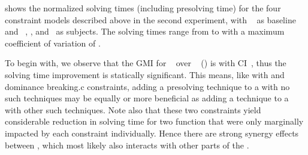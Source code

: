  shows the normalized solving
times (including \gls{presolving} time) for the four \glspl{constraint model}
described above in the second experiment, with ~\modelC{} as \gls{baseline} and ~\modelD,
\modelE, and~\modelF{} as \glspl{subject}.
%
The solving times range from
\printMinSolvingTime{
  \SolvTechEnableOnlyGoodPresolvingPrePlusSolvingTimeSpeedupNonePrePlusSolvingTimeAvgMin,
  \SolvTechEnableOnlyGoodPresolvingPrePlusSolvingTimeSpeedupPrePlusSolvingTimeAvgMin,
  \SolvTechDisableBadPresolvingPrePlusSolvingTimeSpeedupPrePlusSolvingTimeAvgMin,
  \SolvTechDisableAllPresolvingPrePlusSolvingTimeSpeedupPrePlusSolvingTimeAvgMin
} to
\printMaxSolvingTime{
  \SolvTechEnableOnlyGoodPresolvingPrePlusSolvingTimeSpeedupNonePrePlusSolvingTimeAvgMax,
  \SolvTechEnableOnlyGoodPresolvingPrePlusSolvingTimeSpeedupPrePlusSolvingTimeAvgMax,
  \SolvTechDisableBadPresolvingPrePlusSolvingTimeSpeedupPrePlusSolvingTimeAvgMax,
  \SolvTechDisableAllPresolvingPrePlusSolvingTimeSpeedupPrePlusSolvingTimeAvgMax
} with a maximum coefficient of variation of
\numMaxOf{
  \SolvTechEnableOnlyGoodPresolvingPrePlusSolvingTimeSpeedupNonePrePlusSolvingTimeCvMax,
  \SolvTechEnableOnlyGoodPresolvingPrePlusSolvingTimeSpeedupPrePlusSolvingTimeCvMax,
  \SolvTechDisableBadPresolvingPrePlusSolvingTimeSpeedupPrePlusSolvingTimeCvMax,
  \SolvTechDisableAllPresolvingPrePlusSolvingTimeSpeedupPrePlusSolvingTimeCvMax
}.

To begin with, we observe that the \gls{GMI} for ~\modelD{} over ~\modelC{}
() is \printGMI{%
  \SolvTechEnableOnlyGoodPresolvingPrePlusSolvingTimeSpeedupPrePlusSolvingTimeRegularSpeedupGmean%
} with \gls{CI}~\printGMICI{%
  \SolvTechEnableOnlyGoodPresolvingPrePlusSolvingTimeSpeedupPrePlusSolvingTimeRegularSpeedupCiMin%
}{%
  \SolvTechEnableOnlyGoodPresolvingPrePlusSolvingTimeSpeedupPrePlusSolvingTimeRegularSpeedupCiMax%
}, thus the solving time improvement is statically significant.
%
This means, like with  and \gls{dominance
  breaking.c} \glspl{constraint}, adding a \gls{presolving} technique to a
 with no such techniques may be equally or more
beneficial as adding a technique to a  with other
such techniques.
%
Note also that these two \glspl{constraint} yield considerable reduction in
solving time for two \gls{function} that were only marginally impacted by each
\gls{constraint} individually.
%
Hence there are strong synergy effects between , which most likely also interacts with other
parts of the .

